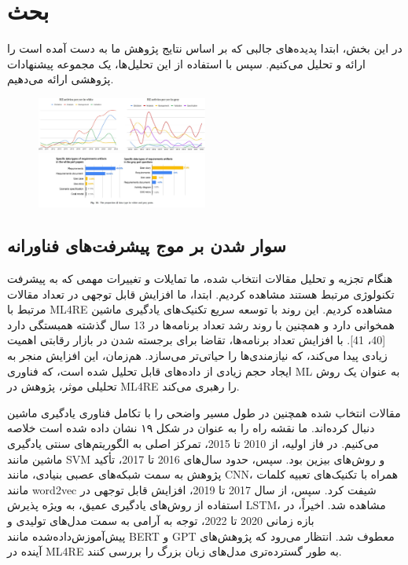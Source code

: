 \documentclass[a4paper,10pt]{article}
\begin{document}

    \section{بحث}

        در این بخش، ابتدا پدیده‌های جالبی که بر اساس نتایج پژوهش ما به دست آمده است را ارائه و تحلیل می‌کنیم. سپس با استفاده از این تحلیل‌ها، یک مجموعه پیشنهادات پژوهشی ارائه می‌دهیم.

        \begin{figure}
            \centering
            \includegraphics[width=0.5\textwidth]{Image/fig-17.jpg}
            \includegraphics[width=0.5\textwidth]{Image/fig-18.jpg}
        \end{figure}

        \subsection{سوار شدن بر موج پیشرفت‌های فناورانه}

            هنگام تجزیه و تحلیل مقالات انتخاب شده، ما تمایلات و تغییرات مهمی که به پیشرفت تکنولوژی مرتبط هستند مشاهده کردیم. ابتدا، ما افزایش قابل توجهی در تعداد مقالات مرتبط با ML4RE مشاهده کردیم. این روند با توسعه سریع تکنیک‌های یادگیری ماشین همخوانی دارد و همچنین با روند رشد تعداد برنامه‌ها در 13 سال گذشته همبستگی دارد [40، 41]. با افزایش تعداد برنامه‌ها، تقاضا برای برجسته شدن در بازار رقابتی اهمیت زیادی پیدا می‌کند، که نیازمندی‌ها را حیاتی‌تر می‌سازد. هم‌زمان، این افزایش منجر به ایجاد حجم زیادی از داده‌های قابل تحلیل شده است، که فناوری ML به عنوان یک روش تحلیلی موثر، پژوهش در ML4RE را رهبری می‌کند.

            مقالات انتخاب شده همچنین در طول مسیر واضحی را با تکامل فناوری یادگیری ماشین دنبال کرده‌اند. ما نقشه راه را به عنوان در شکل ۱۹ نشان داده شده است خلاصه می‌کنیم. در فاز اولیه، از 2010 تا 2015، تمرکز اصلی به الگوریتم‌های سنتی یادگیری ماشین مانند SVM و روش‌های بیزین بود. سپس، حدود سال‌های 2016 تا 2017، تأکید پژوهش به سمت شبکه‌های عصبی بنیادی، مانند CNN، همراه با تکنیک‌های تعبیه کلمات مانند word2vec شیفت کرد. سپس، از سال 2017 تا 2019، افزایش قابل توجهی در استفاده از روش‌های یادگیری عمیق، به ویژه پذیرش LSTM، مشاهده شد. اخیراً، در بازه زمانی 2020 تا 2022، توجه به آرامی به سمت مدل‌های تولیدی و پیش‌آموزش‌داده‌شده مانند BERT و GPT معطوف شد. انتظار می‌رود که پژوهش‌های آینده در ML4RE به طور گسترده‌تری مدل‌های زبان بزرگ را بررسی کنند.
\end{document}
